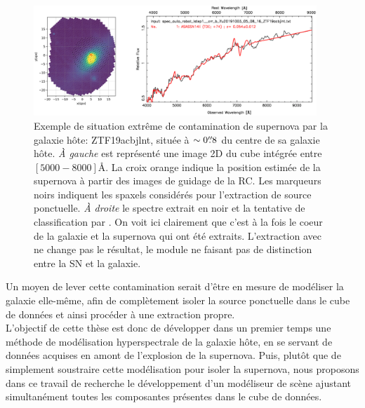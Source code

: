 \documentclass[../main/main.tex]{subfiles}
\begin{document}
\begin{figure}[ht]
  \centering
  \includegraphics[width=0.95\textwidth]{../figures/03_sedm/stronghost.png}
  \caption[Exemple de situation extrême de contamination de supernova
  par la galaxie hôte]{Exemple de situation extrême de contamination de
    supernova par la galaxie hôte: ZTF19acbjlnt, située à $\sim0\overset{\prime\prime}{.}8$
    du centre de sa galaxie hôte. \textit{À gauche} est représenté
    une image 2D du cube intégrée entre $[5000-8000]$\AA. La croix
    orange indique la position estimée de la supernova à partir des
    images de guidage de la RC. Les marqueurs noirs indiquent les
    spaxels considérés pour l'extraction de source ponctuelle. \textit{À droite} le spectre extrait en
    noir et la tentative de classification par . On voit ici
    clairement que c'est à la fois le coeur de la galaxie et la
    supernova qui ont été extraits. L'extraction avec  ne
    change pas le résultat, le module ne faisant pas de distinction entre la SN et
    la galaxie.}
  \label{fig:stronghost}
\end{figure}

Un moyen de lever cette contamination serait d'être en mesure de
modéliser la galaxie elle-même, afin de complètement isoler la source
ponctuelle dans le cube de données et ainsi procéder à une extraction
propre.\\

L'objectif de cette thèse est donc de développer dans un premier temps une méthode de
modélisation hyperspectrale de la galaxie hôte, en se servant
de données acquises en amont de l'explosion de la supernova. Puis,
plutôt que de simplement soustraire cette modélisation pour isoler la
supernova, nous proposons dans ce travail de recherche le développement d'un modéliseur de
scène ajustant simultanément toutes les composantes présentes dans le cube de données.



\end{document}
